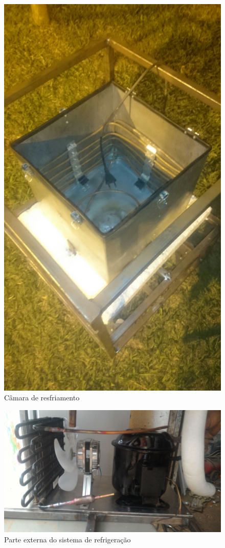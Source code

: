 \begin{figure}[H]
\centering
\includegraphics[width=16cm]{figuras/camaraexterna.png}
\caption{Câmara de resfriamento}
\end{figure}

\begin{figure}[H]
\centering
\includegraphics[width=16cm]{figuras/refrigeracaoext.png}
\caption{Parte externa do sistema de refrigeração}
\end{figure}

